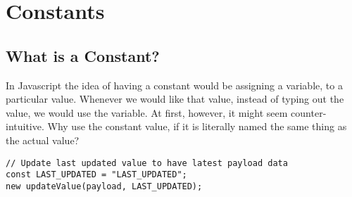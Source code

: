 \maketitle{}
\section{ Constants }

\subsection{ What is a Constant? }
In Javascript the idea of having a constant would be assigning a variable, to a
particular value. Whenever we would like that value, instead of typing out the
value, we would use the variable. At first, however, it might seem
counter-intuitive. Why use the constant value, if it is literally named the same
thing as the actual value?

\begin{lstlisting}[caption=Example of a Constant]
// Update last updated value to have latest payload data
const LAST_UPDATED = "LAST_UPDATED";
new updateValue(payload, LAST_UPDATED);
\end{lstlisting}
